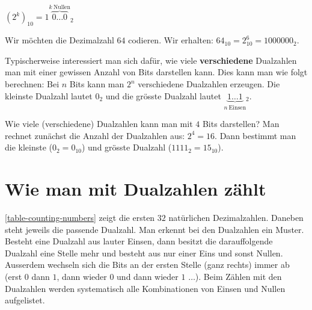 \begin{center}
$(2^k)_{10}=1\overbrace{0\dots0}^{k~\textrm{Nullen}}$$_2$
\end{center}

\begin{example}

Wir möchten die Dezimalzahl $64$ codieren. Wir erhalten: $64_{10} = 2^6_{10} = 1000000_2$.

\end{example}

Typischerweise interessiert man sich dafür, wie viele \textbf{verschiedene} Dualzahlen man mit einer gewissen Anzahl von Bits darstellen kann. Dies kann man wie folgt berechnen: Bei $n$ Bits kann man $2^n$ verschiedene Dualzahlen erzeugen. Die kleinste Dualzahl lautet $0_2$ und die grösste Dualzahl lautet $\underbrace{1\dots1}_{n~\textrm{Einsen}}$$_2$.

\begin{example}

Wie viele (verschiedene) Dualzahlen kann man mit $4$ Bits darstellen? Man rechnet zunächst die Anzahl der Dualzahlen aus: $2^4 = 16$. Dann bestimmt man die kleinste ($0_2 = 0_{10}$) und grösste Dualzahl ($1111_2 = 15_{10}$).

\end{example}

\section{Wie man mit Dualzahlen zählt}

\autoref{table-counting-numbers} zeigt die ersten $32$ natürlichen Dezimalzahlen. Daneben steht jeweils die passende Dualzahl. Man erkennt bei den Dualzahlen ein Muster. Besteht eine Dualzahl aus lauter Einsen, dann besitzt die darauffolgende Dualzahl eine Stelle mehr und besteht aus nur einer Eins und sonst Nullen. Ausserdem wechseln sich die Bits an der ersten Stelle (ganz rechts) immer ab (erst $0$ dann $1$, dann wieder $0$ und dann wieder $1$ $\dots$). Beim Zählen mit den Dualzahlen werden systematisch alle Kombinationen von Einsen und Nullen aufgelistet.

